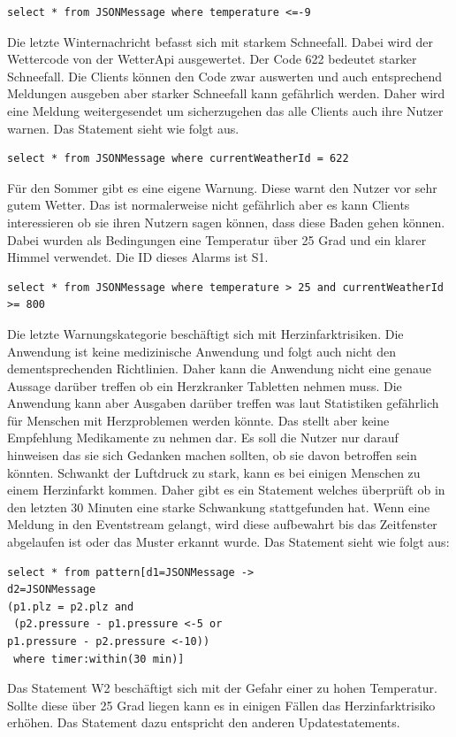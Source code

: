 \begin{lstlisting}
select * from JSONMessage where temperature <=-9
\end{lstlisting}
Die letzte Winternachricht befasst sich mit starkem Schneefall. Dabei wird der Wettercode von der WetterApi ausgewertet. Der Code 622 bedeutet starker Schneefall. Die Clients können den Code zwar auswerten und auch entsprechend Meldungen ausgeben aber starker Schneefall kann gefährlich werden. Daher wird eine Meldung weitergesendet um sicherzugehen das alle Clients auch ihre Nutzer warnen. Das Statement sieht wie folgt aus. 
\begin{lstlisting}
select * from JSONMessage where currentWeatherId = 622
\end{lstlisting}  
Für den Sommer gibt es eine eigene Warnung. Diese warnt den Nutzer vor sehr gutem Wetter. Das ist normalerweise nicht gefährlich aber es kann Clients interessieren ob sie ihren Nutzern sagen können, dass diese Baden gehen können. Dabei wurden als Bedingungen eine Temperatur über 25 Grad und ein klarer Himmel verwendet. Die ID dieses Alarms ist S1. 
\begin{lstlisting}
select * from JSONMessage where temperature > 25 and currentWeatherId >= 800
\end{lstlisting}
Die letzte Warnungskategorie beschäftigt sich mit Herzinfarktrisiken. Die Anwendung ist keine medizinische Anwendung und folgt auch nicht den dementsprechenden Richtlinien. Daher kann die Anwendung nicht eine genaue Aussage darüber treffen ob ein Herzkranker Tabletten nehmen muss. Die Anwendung kann aber Ausgaben darüber treffen was laut Statistiken gefährlich für Menschen mit Herzproblemen werden könnte. Das stellt aber keine Empfehlung Medikamente zu nehmen dar. Es soll die Nutzer nur darauf hinweisen das sie sich Gedanken machen sollten, ob sie davon betroffen sein könnten. 
Schwankt der Luftdruck zu stark, kann es bei einigen Menschen zu einem Herzinfarkt kommen. Daher gibt es ein Statement welches überprüft ob in den letzten 30 Minuten eine starke Schwankung stattgefunden hat. Wenn eine Meldung in den Eventstream gelangt, wird diese aufbewahrt bis das Zeitfenster abgelaufen ist oder das Muster erkannt wurde. Das Statement sieht wie folgt aus:

\begin{lstlisting}
select * from pattern[d1=JSONMessage ->
d2=JSONMessage
(p1.plz = p2.plz and
 (p2.pressure - p1.pressure <-5 or 
p1.pressure - p2.pressure <-10))
 where timer:within(30 min)]
\end{lstlisting} Das Statement W2 beschäftigt sich mit der Gefahr einer zu hohen Temperatur. Sollte diese über 25 Grad liegen kann es in einigen Fällen das Herzinfarktrisiko erhöhen. Das Statement dazu entspricht den anderen Updatestatements. 


